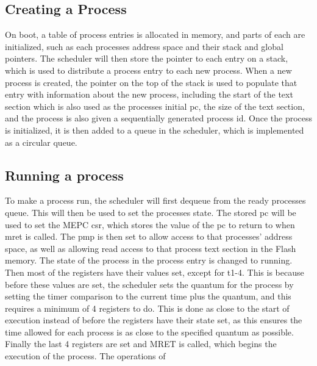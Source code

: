 \subsection{Creating a Process}
On boot, a table of process entries is allocated in memory, and parts of each are initialized, such as each processes address space and their stack and global pointers. The scheduler will then store the pointer to each entry on a stack, which is used to distribute a process entry to each new process. When a new process is created, the pointer on the top of the stack is used to populate that entry with information about the new process, including the start of the text section which is also used as the processes initial pc, the size of the text section, and the process is also given a sequentially generated process id. Once the process is initialized, it is then added to a queue in the scheduler, which is implemented as a circular queue.
\subsection{Running a process}
To make a process run, the scheduler will first dequeue from the ready processes queue. This will then be used to set the processes state. The stored pc will be used to set the MEPC csr, which stores the value of the pc to return to when mret is called. The \ac{pmp} is then set to allow access to that processes' address space, as well as allowing read access to that process text section in the Flash memory. The state of the process in the process entry is changed to running. Then most of the registers have their values set, except for t1-4. This is because before these values are set, the scheduler sets the quantum for the process by setting the timer comparison to the current time plus the quantum, and this requires a minimum of 4 registers to do. This is done as close to the start of execution instead of before the registers have their state set, as this ensures the time allowed for each process is as close to the specified quantum as possible. Finally the last 4 registers are set and MRET is called, which begins the execution of the process. The operations of 
